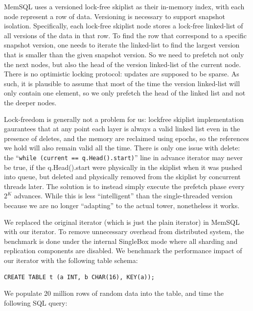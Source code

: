 \documentclass[11pt, usletter]{article}
\begin{document}
MemSQL uses a versioned lock-free skiplist as their in-memory index, with each node represent a row of data. 
Versioning is necessary to support snapshot isolation.
Specifically, each lock-free skiplist node stores a lock-free linked-list of all versions of the data in that row.
To find the row that correspond to a specific snapshot version,
one needs to iterate the linked-list to find the largest version that is smaller than the given snapshot version. 
So we need to prefetch not only the next nodes, but also the head of the version linked-list of the current node.
There is no optimistic locking protocol: updates are supposed to be sparse. 
As such, it is plausible to assume that most of the time the version linked-list will only contain one element, 
so we only prefetch the head of the linked list and not the deeper nodes. 

Lock-freedom is generally not a problem for us: 
lockfree skiplist implementation gaurantees that 
at any point each layer is always a valid linked list even in the presence of deletes, 
and the memory are reclaimed using epochs, 
so the references we hold will also remain valid all the time. 
There is only one issue with delete: the ``\verb|while (current == q.Head().start)|'' line in advance iterator 
may never be true, if the q.Head().start were physically in the skiplist when it was pushed into queue, 
but deleted and physically removed from the skiplist by concurrent threads later. 
The solution is to instead simply execute the prefetch phase every $2^K$ advances. 
While this is less ``intelligent'' than the single-threaded version 
because we are no longer ``adapting'' to the actual tower, nonetheless it works.

We replaced the original iterator (which is just the plain iterator) in MemSQL with our iterator. 
To remove unnecessary overhead from distributed system, 
the benchmark is done under the internal SingleBox mode where all sharding and replication components are disabled.
We benchmark the performance impact of our iterator with the following table schema:

\singlespacing\begin{codebox}
\begin{verbatim}
CREATE TABLE t (a INT, b CHAR(16), KEY(a));
\end{verbatim}
\end{codebox}\doublespacing

We populate 20 million rows of random data into the table, and time the following SQL query:
\end{document}
